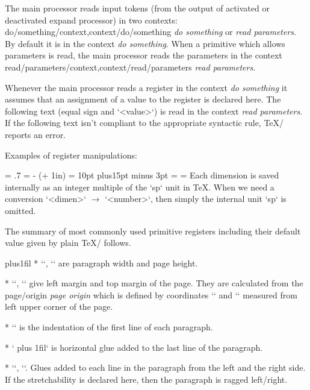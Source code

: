 {\removelastskip
The main processor reads input tokens (from the output of activated or
deactivated expand processor) in two contexts: 
\ii do/something/context,context/do/something {\em do something} or {\em
read parameters}. By default it is in the context {\em do something}. When a
primitive which allows parameters is read, the main processor reads the
parameters in the context \ii read/parameters/context,context/read/parameters {\em read parameters}.

Whenever the main processor reads a register in the context
{\em do something} it assumes that an assignment of a value to the register
is declared here. The following text (equal sign and `<value>`) is read in the context
{\em read parameters}. If the following text isn't
compliant to the appropriate syntactic rule, \TeX/ reports an error.

Examples of register manipulations:

\begtt
\newcount\mynumber \newdimen\mydimen \newdimen\myskip
\hsize = .7\hsize  %
\hoffset = \dimexpr 10mm - (\parindent + 1in) \relax %
\myskip = 10pt plus15pt minus 3pt
\mydimen = \myskip    %
\mynumber = \mydimen  %
\endtt
%
Each dimension is saved internally as an integer multiple of the `sp` unit in
\TeX. When we need a conversion `<dimen>` $\to$ `<number>`, then simply the
internal unit `sp` is omitted.

The summary of most commonly used primitive registers including their default
value given by plain \TeX/ follows.

\begitems  \rightskip=0pt plus1fil
* \y`\hsize=6.5in`,
  \y`\vsize=8.9in`
  are paragraph width and page height.

* \y`\hoffset=0pt`,
  \y`\voffset=0pt` give left margin and top margin of the page. They are
  calculated from the \ii page/origin {\em page origin} which is defined by coordinates
  \y`\pdfvorigin=1in` and \y`\pdfhorigin=1in` measured from left upper corner of
  the page.

* \y`\parindent=20pt` is the indentation of the first line of each paragraph.

* \y`\parfillskip=0pt plus 1fil` is horizontal glue added to the last line of the
  paragraph.

* \y`\leftskip=0pt`, \y`\rightskip=0pt`. Glues added to each line in the
  paragraph from the left and the right side. If the stretchability is declared here,
  then the paragraph is ragged left/right.

}
